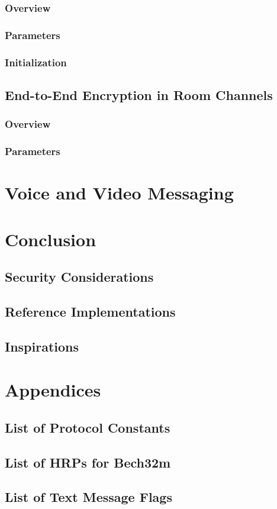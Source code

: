 \documentclass{article}
\begin{document}
\subsubsection{Overview}

\subsubsection{Parameters}

\subsubsection{Initialization} \label{4_4_3}

\subsection{End-to-End Encryption in Room Channels}

\subsubsection{Overview}

\subsubsection{Parameters}


\section{Voice and Video Messaging}


\section{Conclusion}

\subsection{Security Considerations}


\subsection{Reference Implementations}

\subsection{Inspirations}


\section{Appendices}

\subsection{List of Protocol Constants}

\subsection{List of HRPs for Bech32m}

\subsection{List of Text Message Flags}
\end{document}

